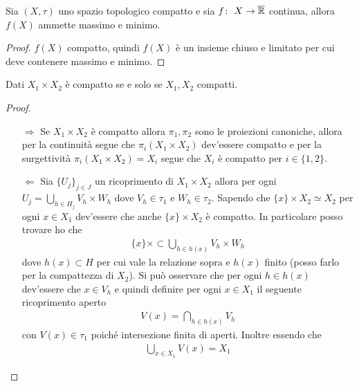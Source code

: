 \begin{corollary}[Weierstrass]
	Sia $(X, \tau)$ uno spazio topologico compatto e sia $f \colon\ X \rightarrow \overline{\mathbb{R}}$ continua, allora $f(X)$ ammette massimo e minimo.
\end{corollary} 
\begin{proof}
	$f(X)$ compatto, quindi $f(X)$ è un insieme chiuso e limitato per cui deve contenere massimo e minimo.
\end{proof}

\begin{theorem}[Tychonoff]
	Dati $X_1 \times X_2$ è compatto se e solo se $X_1,X_2$ compatti. 
\end{theorem} 
\begin{proof}
	\begin{enumerate}
		\item[$\Rightarrow$] Se $X_1 \times X_2$ è compatto allora $\pi_1, \pi_2$ sono le proiezioni canoniche, allora per la continuità segue che $\pi_i(X_1 \times X_2)$ dev'essere compatto e per la surgettività $ \pi_i(X_1 \times X_2) = X_i$  segue che $X_i$ è compatto per $i \in \{1,2\}$.
		\item[$\Leftarrow$] Sia $\{U_j\}_{j \in J}$ un ricoprimento di $X_1 \times X_2$ allora per ogni $U_j = \bigcup_{h \in H_j} V_h \times W_h$ dove $V_h \in \tau_1$ e $W_h \in \tau_2$. Sapendo che $\{x\} \times X_2 \simeq X_2$ per ogni  $x \in X_1$ dev'essere che anche $\{x\} \times X_2$ è compatto. In particolare posso trovare ho che 
		\begin{equation}
		\begin{aligned}
			\{x\} \times \subset \bigcup_{h \in h(x)} V_h \times W_h
		\end{aligned}
		\end{equation}
		dove $h(x) \subset H$ per cui vale la relazione sopra e $h(x)$ finito (posso farlo per la compattezza di $X_2$). Si può osservare che per ogni $h \in h(x)$ dev'essere che $x \in V_h$ e quindi definire per ogni $x \in X_1$ il seguente ricoprimento aperto 
		\begin{equation}
		\begin{aligned}
		V(x) = \bigcap_{h \in h(x)} V_h
		\end{aligned}
		\end{equation}
		con $V(x) \in \tau_1$ poiché intersezione finita di aperti. Inoltre essendo che 
		\begin{equation}
		\begin{aligned}
		\bigcup_{x \in X_1} V(x) = X_1
		\end{aligned}

\end{equation}
\end{enumerate}
\end{proof}
